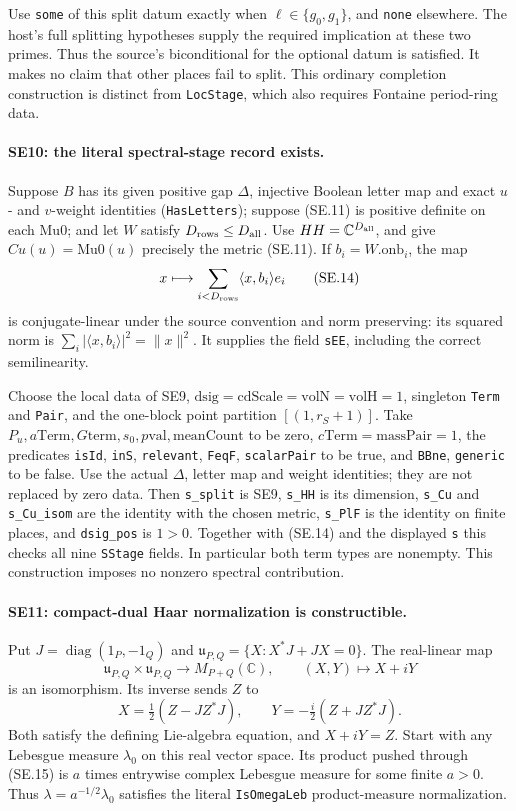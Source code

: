Use \texttt{some} of this split datum exactly when
$\ell\in\{g_0,g_1\}$, and \texttt{none} elsewhere. The host's full
splitting hypotheses supply the required implication at these two
primes. Thus the source's biconditional for the optional datum is
satisfied. It makes no claim that other places fail to split.
This ordinary completion construction is distinct from
\texttt{LocStage}, which also requires Fontaine period-ring data.

\paragraph{SE10: the literal spectral-stage record exists.}
Suppose $B$ has its given positive gap $\Delta$, injective Boolean
letter map and exact $u$- and $v$-weight identities
(\texttt{HasLetters}); suppose (SE.11) is positive definite on
each $\mathrm{Mu0}$; and let $W$ satisfy
$D_{\rm rows}\le D_{\rm all}$. Use $HH=\mathbb C^{D_{\rm all}}$,
and give $Cu(u)=\mathrm{Mu0}(u)$ precisely the metric (SE.11).
If $b_i=W.\mathrm{onb}_i$, the map
\[
 x\longmapsto\sum_{i<D_{\rm rows}}\langle x,b_i\rangle e_i
 \tag{SE.14}
\]
is conjugate-linear under the source convention and norm preserving:
its squared norm is $\sum_i|\langle x,b_i\rangle|^2=\|x\|^2$.
It supplies the field \texttt{sEE}, including the correct semilinearity.

Choose the local data of SE9, $\mathrm{dsig}=\mathrm{cdScale}
=\mathrm{volN}=\mathrm{volH}=1$, singleton \texttt{Term} and
\texttt{Pair}, and the one-block point partition $[(1,r_S+1)]$.
Take $P_u,a\mathrm{Term},G\mathrm{term},s_0,p\mathrm{val},
\mathrm{meanCount}$ to be zero, $c\mathrm{Term}=\mathrm{massPair}=1$,
the predicates \texttt{isId}, \texttt{inS}, \texttt{relevant},
\texttt{FeqF}, \texttt{scalarPair} to be true, and
\texttt{BBne}, \texttt{generic} to be false. Use the actual
$\Delta$, letter map and weight identities; they are not replaced
by zero data. Then \texttt{s\_split} is SE9, \texttt{s\_HH} is its
dimension, \texttt{s\_Cu} and \texttt{s\_Cu\_isom} are the identity
with the chosen metric, \texttt{s\_PlF} is the identity on finite
places, and \texttt{dsig\_pos} is $1>0$. Together with (SE.14) and
the displayed \texttt{s} this checks all nine \texttt{SStage} fields.
In particular both term types are nonempty. This construction imposes
no nonzero spectral contribution.

\paragraph{SE11: compact-dual Haar normalization is constructible.}
Put $J=\operatorname{diag}(1_P,-1_Q)$ and
$\mathfrak u_{P,Q}=\{X:X^*J+JX=0\}$. The real-linear map
\[
 \mathfrak u_{P,Q}\times\mathfrak u_{P,Q}\longrightarrow M_{P+Q}(\mathbb C),
 \qquad(X,Y)\longmapsto X+iY
 \tag{SE.15}
\]
is an isomorphism. Its inverse sends $Z$ to
\[
 X=\tfrac12(Z-JZ^*J),\qquad
 Y=-\tfrac i2(Z+JZ^*J).
 \tag{SE.16}
\]
Both satisfy the defining Lie-algebra equation, and $X+iY=Z$.
Start with any Lebesgue measure $\lambda_0$ on this real vector space.
Its product pushed through (SE.15) is $a$ times entrywise complex
Lebesgue measure for some finite $a>0$. Thus
$\lambda=a^{-1/2}\lambda_0$ satisfies the literal
\texttt{IsOmegaLeb} product-measure normalization.

